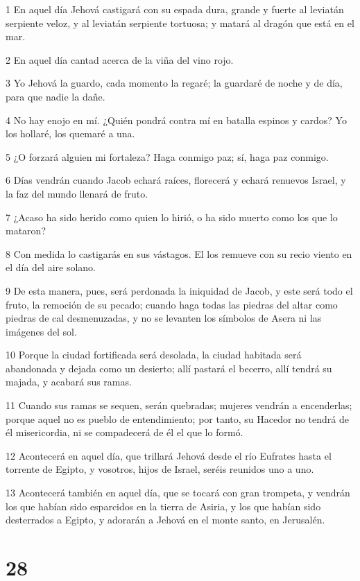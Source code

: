 \par 1 En aquel día Jehová castigará con su espada dura, grande y fuerte al leviatán serpiente veloz, y al leviatán serpiente tortuosa; y matará al dragón que está en el mar.
\par 2 En aquel día cantad acerca de la viña del vino rojo.
\par 3 Yo Jehová la guardo, cada momento la regaré; la guardaré de noche y de día, para que nadie la dañe.
\par 4 No hay enojo en mí. ¿Quién pondrá contra mí en batalla espinos y cardos? Yo los hollaré, los quemaré a una.
\par 5 ¿O forzará alguien mi fortaleza? Haga conmigo paz; sí, haga paz conmigo.
\par 6 Días vendrán cuando Jacob echará raíces, florecerá y echará renuevos Israel, y la faz del mundo llenará de fruto.
\par 7 ¿Acaso ha sido herido como quien lo hirió, o ha sido muerto como los que lo mataron?
\par 8 Con medida lo castigarás en sus vástagos. El los remueve con su recio viento en el día del aire solano.
\par 9 De esta manera, pues, será perdonada la iniquidad de Jacob, y este será todo el fruto, la remoción de su pecado; cuando haga todas las piedras del altar como piedras de cal desmenuzadas, y no se levanten los símbolos de Asera ni las imágenes del sol.
\par 10 Porque la ciudad fortificada será desolada, la ciudad habitada será abandonada y dejada como un desierto; allí pastará el becerro, allí tendrá su majada, y acabará sus ramas.
\par 11 Cuando sus ramas se sequen, serán quebradas; mujeres vendrán a encenderlas; porque aquel no es pueblo de entendimiento; por tanto, su Hacedor no tendrá de él misericordia, ni se compadecerá de él el que lo formó.
\par 12 Acontecerá en aquel día, que trillará Jehová desde el río Eufrates hasta el torrente de Egipto, y vosotros, hijos de Israel, seréis reunidos uno a uno.
\par 13 Acontecerá también en aquel día, que se tocará con gran trompeta, y vendrán los que habían sido esparcidos en la tierra de Asiria, y los que habían sido desterrados a Egipto, y adorarán a Jehová en el monte santo, en Jerusalén.

\chapter{28}

